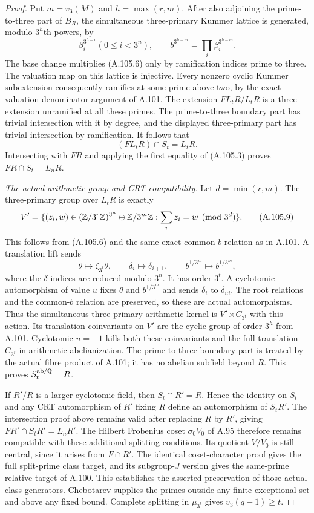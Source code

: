 \begin{proof}
Put $m=v_3(M)$ and $h=\max(r,m)$.
After also adjoining the prime-to-three part of
$B_R$, the simultaneous three-primary Kummer lattice
is generated, modulo $3^h$th powers, by
\[
 \beta_i^{3^{h-r}} (0\le i<3^n),
                  \qquad b^{3^{h-m}}=
                            \prod_i\beta_i^{3^{h-m}}.
 \tag{A.105.7}
\]
The base change multiplies (A.105.6) only by
ramification indices prime to three.
The valuation map on this lattice is injective.
Every nonzero cyclic Kummer subextension consequently
ramifies at some prime above two, by the exact
valuation-denominator argument of A.101.
The extension $FL_tR/L_tR$ is a three-extension
unramified at all these primes.
The prime-to-three boundary part has trivial
intersection with it by degree, and the displayed
three-primary part has trivial intersection by
ramification.
It follows that
\[
                  (FL_tR)\cap S_t=L_tR.
 \tag{A.105.8}
\]
Intersecting with $FR$ and applying the first equality
of (A.105.3) proves $FR\cap S_t=L_nR$.

\emph{The actual arithmetic group and CRT compatibility.}
Let $d=\min(r,m)$.
The three-primary group over $L_tR$ is exactly
\[
 V'=\{(z_i,w)\in(\mathbb Z/3^r\mathbb Z)^{3^n}\oplus\mathbb Z/3^m\mathbb Z:
                         \sum_i z_i=w\pmod{3^d}\}.
 \tag{A.105.9}
\]
This follows from (A.105.6) and the same exact
common-$b$ relation as in A.101.
A translation lift sends
\[
 \theta\longmapsto\zeta_{3^t}\theta,
       \qquad \delta_i\longmapsto\delta_{i+1},
       \qquad b^{1/3^m}\longmapsto b^{1/3^m},
 \tag{A.105.10}
\]
where the $\delta$ indices are reduced modulo $3^n$.
It has order $3^t$.
A cyclotomic automorphism of value $u$ fixes $\theta$
and $b^{1/3^m}$ and sends $\delta_i$ to $\delta_{ui}$.
The root relations and the common-$b$ relation are
preserved, so these are actual automorphisms.
Thus the simultaneous three-primary arithmetic
kernel is $V'\rtimes C_{3^t}$ with this action.
Its translation coinvariants on $V'$ are the cyclic
group of order $3^h$ from A.101.
Cyclotomic $u=-1$ kills both these coinvariants and
the full translation $C_{3^t}$ in arithmetic
abelianization.
The prime-to-three boundary part is treated by the
actual fibre product of A.101; it has no abelian
subfield beyond $R$.
This proves $S_t^{\rm ab/\mathbb Q}=R$.

If $R'/R$ is a larger cyclotomic field, then
$S_t\cap R'=R$.
Hence the identity on $S_t$ and any CRT automorphism
of $R'$ fixing $R$ define an automorphism of $S_tR'$.
The intersection proof above remains valid after
replacing $R$ by $R'$, giving
$FR'\cap S_tR'=L_nR'$.
The Hilbert Frobenius coset $\sigma_0V_0$ of A.95
therefore remains compatible with these additional
splitting conditions.
Its quotient $V/V_0$ is still central, since it
arises from $F\cap R'$.
The identical coset-character proof gives the full
split-prime class target, and its subgroup-$J$
version gives the same-prime relative target of
A.100.
This establishes the asserted preservation of those
actual class generators.
Chebotarev supplies the primes outside any finite
exceptional set and above any fixed bound.
Complete splitting in $\mu_{3^t}$ gives
$v_3(q-1)\ge t$.


\end{proof}
